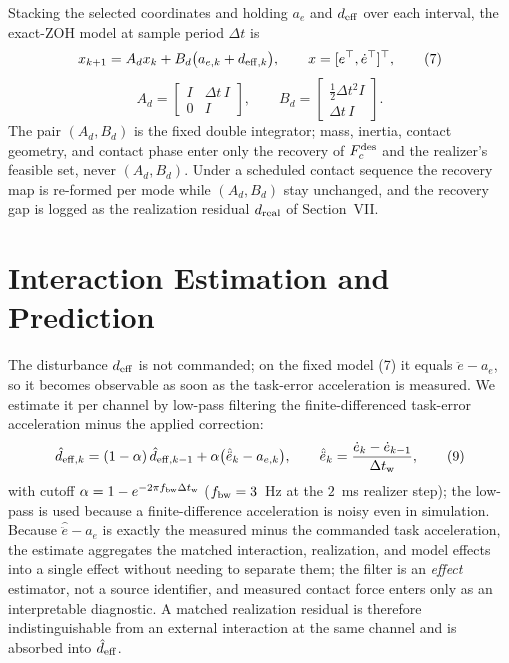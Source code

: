 \documentclass[journal]{IEEEtran}
\theoremstyle{plain}
\theoremstyle{definition}
\theoremstyle{remark}
\newcommand{\deff}{d_{\rm eff}}
\begin{document}
Stacking the selected coordinates and holding $a_e$ and $\deff$ over each interval, the exact-ZOH model at sample period $\Delta t$ is
\begin{equation}
x_{k+1}=A_dx_k+B_d\big(a_{e,k}+d_{{\rm eff},k}\big),\qquad
x=[e^\top,\dot e^\top]^\top,
\tag{7}
\end{equation}
\begin{equation}
A_d=\begin{bmatrix}I&\Delta t\,I\\0&I\end{bmatrix},\qquad
B_d=\begin{bmatrix}\tfrac12\Delta t^2I\\\Delta t\,I\end{bmatrix}.
\tag{8}
\end{equation}
The pair $(A_d,B_d)$ is the fixed double integrator; mass, inertia, contact geometry, and contact phase enter only the recovery of $F_c^{\rm des}$ and the realizer's feasible set, never $(A_d,B_d)$. Under a scheduled contact sequence the recovery map is re-formed per mode while $(A_d,B_d)$ stay unchanged, and the recovery gap is logged as the realization residual $d_{\rm real}$ of Section~VII.

\section{Interaction Estimation and Prediction}\label{sec:estimation}

The disturbance $\deff$ is not commanded; on the fixed model (7) it equals $\ddot e-a_e$, so it becomes observable as soon as the task-error acceleration is measured. We estimate it per channel by low-pass filtering the finite-differenced task-error acceleration minus the applied correction:
\begin{equation}
\hat d_{{\rm eff},k}=(1-\alpha)\,\hat d_{{\rm eff},k-1}
+\alpha\big(\hat{\ddot e}_k-a_{e,k}\big),\qquad
\hat{\ddot e}_k=\frac{\dot e_k-\dot e_{k-1}}{\Delta t_{\rm w}} ,
\tag{9}
\end{equation}
with cutoff $\alpha=1-e^{-2\pi f_{\rm bw}\Delta t_{\rm w}}$ ($f_{\rm bw}=3$~Hz at the $2$~ms realizer step); the low-pass is used because a finite-difference acceleration is noisy even in simulation. Because $\hat{\ddot e}-a_e$ is exactly the measured minus the commanded task acceleration, the estimate aggregates the matched interaction, realization, and model effects into a single effect without needing to separate them; the filter is an \emph{effect} estimator, not a source identifier, and measured contact force enters only as an interpretable diagnostic. A matched realization residual is therefore indistinguishable from an external interaction at the same channel and is absorbed into $\hat \deff$.
\end{document}
